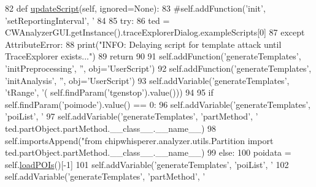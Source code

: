 \begin{DoxyCode}
82     \textcolor{keyword}{def }\hyperlink{classsoftware_1_1chipwhisperer_1_1analyzer_1_1attacks_1_1profiling__algorithms_1_1template_1_1ProfilingTemplate_ae1550fc7220093d4fcfe226a157e2ed9}{updateScript}(self, ignored=None):
83         \textcolor{comment}{#self.addFunction('init', 'setReportingInterval', '%
84 
85         \textcolor{keywordflow}{try}:
86             ted = CWAnalyzerGUI.getInstance().traceExplorerDialog.exampleScripts[0]
87         \textcolor{keywordflow}{except} AttributeError:
88             print(\textcolor{stringliteral}{"INFO: Delaying script for template attack until TraceExplorer exists..."})
89             \textcolor{keywordflow}{return}
90 
91         self.addFunction(\textcolor{stringliteral}{'generateTemplates'}, \textcolor{stringliteral}{'initPreprocessing'}, \textcolor{stringliteral}{''}, obj=\textcolor{stringliteral}{'UserScript'})
92         self.addFunction(\textcolor{stringliteral}{'generateTemplates'}, \textcolor{stringliteral}{'initAnalysis'}, \textcolor{stringliteral}{''}, obj=\textcolor{stringliteral}{'UserScript'})
93         self.addVariable(\textcolor{stringliteral}{'generateTemplates'}, \textcolor{stringliteral}{'tRange'}, \textcolor{stringliteral}{'(%
      self.findParam(\textcolor{stringliteral}{'tgenstop'}).value()))
94 
95         \textcolor{keywordflow}{if} self.findParam(\textcolor{stringliteral}{'poimode'}).value() == 0:
96             self.addVariable(\textcolor{stringliteral}{'generateTemplates'}, \textcolor{stringliteral}{'poiList'}, \textcolor{stringliteral}{'%
97             self.addVariable(\textcolor{stringliteral}{'generateTemplates'}, \textcolor{stringliteral}{'partMethod'}, \textcolor{stringliteral}{'%
      ted.partObject.partMethod.\_\_class\_\_.\_\_name\_\_)
98             self.importsAppend(\textcolor{stringliteral}{"from chipwhisperer.analyzer.utils.Partition import %
      ted.partObject.partMethod.\_\_class\_\_.\_\_name\_\_)
99         \textcolor{keywordflow}{else}:
100             poidata = self.\hyperlink{classsoftware_1_1chipwhisperer_1_1analyzer_1_1attacks_1_1profiling__algorithms_1_1template_1_1ProfilingTemplate_a93184b469db7613d1d3aca33b4b4d6f1}{loadPOIs}()[-1]
101             self.addVariable(\textcolor{stringliteral}{'generateTemplates'}, \textcolor{stringliteral}{'poiList'}, \textcolor{stringliteral}{'%
102             self.addVariable(\textcolor{stringliteral}{'generateTemplates'}, \textcolor{stringliteral}{'partMethod'}, \textcolor{stringliteral}{'%
}}}}}}}
\end{DoxyCode}
